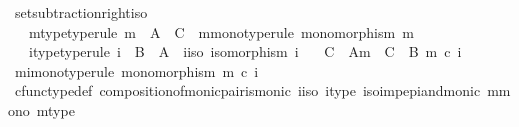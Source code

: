 \begin{isabellebody}
\isamarkupfalse%
%
\endisatagproof
{\isafoldproof}%
%
\isadelimproof
\isanewline
%
\endisadelimproof
\isanewline
{}\isamarkupfalse%
\ set{\isacharunderscore}{\kern0pt}subtraction{\isacharunderscore}{\kern0pt}right{\isacharunderscore}{\kern0pt}iso{\isacharcolon}{\kern0pt}\isanewline
\ \ \ m{\isacharunderscore}{\kern0pt}type{\isacharbrackleft}{\kern0pt}type{\isacharunderscore}{\kern0pt}rule{\isacharbrackright}{\kern0pt}{\isacharcolon}{\kern0pt}\ {\isachardoublequoteopen}m\ {\isacharcolon}{\kern0pt}\ A\ {\isasymrightarrow}\ C{\isachardoublequoteclose}\ \ m{\isacharunderscore}{\kern0pt}mono{\isacharbrackleft}{\kern0pt}type{\isacharunderscore}{\kern0pt}rule{\isacharbrackright}{\kern0pt}{\isacharcolon}{\kern0pt}\ {\isachardoublequoteopen}monomorphism\ m{\isachardoublequoteclose}\isanewline
\ \ \ i{\isacharunderscore}{\kern0pt}type{\isacharbrackleft}{\kern0pt}type{\isacharunderscore}{\kern0pt}rule{\isacharbrackright}{\kern0pt}{\isacharcolon}{\kern0pt}\ {\isachardoublequoteopen}i\ {\isacharcolon}{\kern0pt}\ B\ {\isasymrightarrow}\ A{\isachardoublequoteclose}\ \ i{\isacharunderscore}{\kern0pt}iso{\isacharcolon}{\kern0pt}\ {\isachardoublequoteopen}isomorphism\ i{\isachardoublequoteclose}\isanewline
\ \ \ {\isachardoublequoteopen}C\ {\isasymsetminus}\ {\isacharparenleft}{\kern0pt}A{\isacharcomma}{\kern0pt}m{\isacharparenright}{\kern0pt}\ {\isacharequal}{\kern0pt}\ C\ {\isasymsetminus}\ {\isacharparenleft}{\kern0pt}B{\isacharcomma}{\kern0pt}\ m\ {\isasymcirc}\isactrlsub c\ i{\isacharparenright}{\kern0pt}{\isachardoublequoteclose}\isanewline
%
\isadelimproof
%
\endisadelimproof
%
\isatagproof
{}\isamarkupfalse%
\ {\isacharminus}{\kern0pt}\isanewline
\ \ \isamarkupfalse%
\ mi{\isacharunderscore}{\kern0pt}mono{\isacharbrackleft}{\kern0pt}type{\isacharunderscore}{\kern0pt}rule{\isacharbrackright}{\kern0pt}{\isacharcolon}{\kern0pt}\ {\isachardoublequoteopen}monomorphism\ {\isacharparenleft}{\kern0pt}m\ {\isasymcirc}\isactrlsub c\ i{\isacharparenright}{\kern0pt}{\isachardoublequoteclose}\isanewline
\ \ \ \ \isamarkupfalse%
\ cfunc{\isacharunderscore}{\kern0pt}type{\isacharunderscore}{\kern0pt}def\ composition{\isacharunderscore}{\kern0pt}of{\isacharunderscore}{\kern0pt}monic{\isacharunderscore}{\kern0pt}pair{\isacharunderscore}{\kern0pt}is{\isacharunderscore}{\kern0pt}monic\ i{\isacharunderscore}{\kern0pt}iso\ i{\isacharunderscore}{\kern0pt}type\ iso{\isacharunderscore}{\kern0pt}imp{\isacharunderscore}{\kern0pt}epi{\isacharunderscore}{\kern0pt}and{\isacharunderscore}{\kern0pt}monic\ m{\isacharunderscore}{\kern0pt}mono\ m{\isacharunderscore}{\kern0pt}type\ \isamarkupfalse%

\end{isabellebody}
